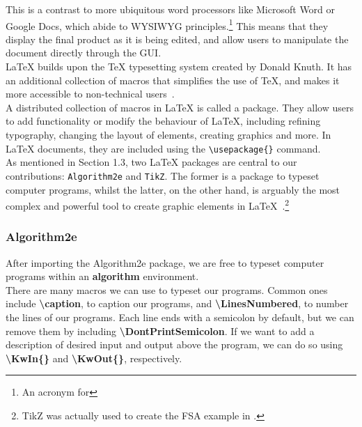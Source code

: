 This is a contrast to more ubiquitous word processors like Microsoft Word or Google Docs, which abide to WYSIWYG principles.\footnote{An acronym for } This means that they display the final product as it is being edited, and allow users to manipulate the document directly through the GUI. \\

LaTeX builds upon the TeX typesetting system created by Donald Knuth. It has an additional collection of macros that simplifies the use of TeX, and makes it more accessible to non-technical users~\cite[7]{latex}. \\

A distributed collection of macros in LaTeX is called a package. They allow users to add functionality or modify the behaviour of LaTeX, including refining typography, changing the layout of elements, creating graphics and more. In LaTeX documents, they are included using the \texttt{\textbackslash usepackage\{\}} command. \\

As mentioned in Section 1.3, two LaTeX packages are central to  our contributions: \texttt{Algorithm2e} and \texttt{TikZ}. The former is a package to typeset computer programs, whilst the latter, on the other hand, is arguably the most complex and powerful tool to create graphic elements in LaTeX~\cite{algorithm2e, tikz}.\footnote{TikZ was actually used to create the FSA example in .}

\subsubsection{Algorithm2e}

After importing the Algorithm2e package, we are free to typeset computer programs within an \textbf{algorithm} environment. \\

There are many macros we can use to typeset our programs. Common ones include \textbf{\textbackslash caption}, to caption our programs, and \textbf{\textbackslash LinesNumbered}, to number the lines of our programs. Each line ends with a semicolon by default, but we can remove them by including \textbf{\textbackslash DontPrintSemicolon}. If we want to add a description of desired input and output above the program, we can do so using \textbf{\textbackslash KwIn\{\}} and \textbf{\textbackslash KwOut\{\}}, respectively. \\

